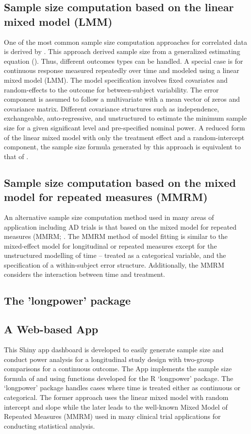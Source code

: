 \documentclass[oupdraft]{bio}
\begin{document}
\subsection{Sample size computation based on the linear mixed model (LMM)}
\label{model}
One of the most common sample size computation approaches for correlated data is derived by \cite{Liu_Liang(1997)}. This approach derived sample size from a generalized estimating equation (\cite{Liang_Zeger(1986)}). Thus, different outcomes types can be handled. A special case is for continuous response measured repeatedly over time and modeled using a linear mixed model (LMM). The model specification involves fixed covariates and random-effects to the outcome for between-subject variability. The error component is assumed to follow a multivariate with a mean vector of zeros and covariance matrix. Different covariance structures such as independence, exchangeable, auto-regressive, and unstructured to estimate the minimum sample size for a given significant level and pre-specified nominal power. A reduced form of the linear mixed model with only the treatment effect and a random-intercept component, the sample size formula generated by this approach is equivalent to that of \cite{Diggle_Liang_Zeger(1994)}. 

\subsection{Sample size computation based on the mixed model for repeated measures (MMRM)}
\label{model2}
An alternative sample size computation method used in many areas of application including AD trials is that based on the mixed model for repeated measures (MMRM; \cite{Mallinckrodt_etal(2001),Mallinckrodt_etal(2003),Lane(2008)}. The MMRM method of model fitting is similar to the mixed-effect model for longitudinal or repeated measures except for the unstructured modelling of time – treated as a categorical variable, and the specification of a within-subject error structure. Additionally, the MMRM considers the interaction between time and treatment. 

\subsection{The 'longpower' package}
\label{model3}

\subsection{A Web-based App}
\label{model4}
This Shiny app dashboard is developed to easily generate sample size and conduct power analysis for a longitudinal study design with two-group comparisons for a continuous outcome. The App implements the sample size formula of \cite{Liu_Liang(1997)} and \cite{Diggle_Liang_Zeger(1994),Diggle_etal(2002)} using functions developed for the R `longpower' package. The `longpower' package handles cases where time is treated either as continuous or categorical. The former approach uses the linear mixed model with random intercept and slope while the later leads to the well-known Mixed Model of Repeated Measures (MMRM) used in many clinical trial applications for conducting statistical analysis. 
\end{document}
